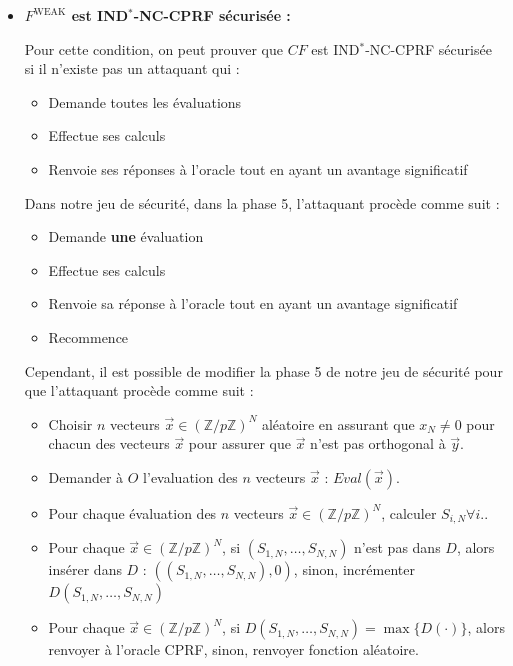 \documentclass[9pt]{extarticle}
\begin{document}
\begin{itemize}
On dit que $P$ est non programmable si $P.Prog$ ne met pas à jour $\sigma_P$ et l'exécution de $P.Ls$ sur différentes entrées ne change pas la distribution de sa sortie.

Dans notre implémentation de $F^{\text{WEAK}}$, nous utilisons le lazy sampling pour implémenter la fonction de hachage $H$. Ceci implique que $Eval_H(\vec{x}) = H(S \cdot \vec{x})$ est fixé uniquement lorsque l'évaluation de $\vec{x}$ est demandée, mais pas plus tôt.

On peut donc conclure que $P$ est non-programmable.

\item \textbf{$F^{\text{WEAK}}$ est IND$^*$-NC-CPRF sécurisée :}

Pour cette condition, on peut prouver que $CF$ est IND$^*$-NC-CPRF sécurisée si il n'existe pas un attaquant qui :

\begin{itemize}
  \item Demande toutes les évaluations
  \item Effectue ses calculs
  \item Renvoie ses réponses à l'oracle tout en ayant un avantage significatif
\end{itemize}

Dans notre jeu de sécurité, dans la phase 5, l'attaquant procède comme suit : 

\begin{itemize}
  \item Demande \textbf{une} évaluation
  \item Effectue ses calculs
  \item Renvoie sa réponse à l'oracle tout en ayant un avantage significatif
  \item Recommence
\end{itemize}

Cependant, il est possible de modifier la phase 5 de notre jeu de sécurité pour que l'attaquant procède comme suit : 

\begin{itemize}
  \item Choisir $n$ vecteurs $\vec{x} \in (\mathbb{Z}/p\mathbb{Z})^N$ aléatoire en assurant que $x_N \neq 0$ pour chacun des vecteurs $\vec{x}$ pour assurer que $\vec{x}$ n'est pas orthogonal à $\vec{y}$.
  \item Demander à $O$ l'evaluation des $n$ vecteurs $\vec{x}$ : $Eval(\vec{x})$.
  \item Pour chaque évaluation des $n$ vecteurs $\vec{x} \in (\mathbb{Z}/p\mathbb{Z})^N$, calculer $S_{i,N} \forall i$..
  \item Pour chaque $\vec{x} \in (\mathbb{Z}/p\mathbb{Z})^N$, si $(S_{1,N},\ldots,S_{N,N})$ n'est pas dans $D$, alors insérer dans $D$ : $( (S_{1,N},\ldots,S_{N,N}), 0)$, sinon, incrémenter $D(S_{1,N},\ldots,S_{N,N})$
  \item Pour chaque $\vec{x} \in (\mathbb{Z}/p\mathbb{Z})^N$, si $D(S_{1,N},\ldots,S_{N,N}) = \max\{D(\cdot)\}$, alors renvoyer à l'oracle CPRF, sinon, renvoyer fonction aléatoire.
\end{itemize}


\end{itemize}
\end{document}
